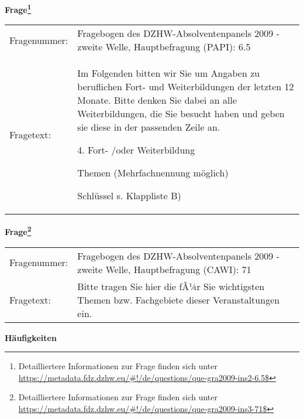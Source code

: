 				\vspace*{0.5cm}
                \noindent\textbf{Frage\footnote{Detailliertere Informationen zur Frage finden sich unter
		              \url{https://metadata.fdz.dzhw.eu/\#!/de/questions/que-gra2009-ins2-6.5$}}}\\
				\begin{tabularx}{\hsize}{@{}lX}
					Fragenummer: &
					  Fragebogen des DZHW-Absolventenpanels 2009 - zweite Welle, Hauptbefragung (PAPI):
					  6.5
 \\
					Fragetext: & Im Folgenden bitten wir Sie um Angaben zu beruflichen Fort- und Weiterbildungen der letzten 12 Monate. Bitte denken Sie dabei an alle Weiterbildungen, die Sie besucht haben und geben sie diese in der passenden Zeile an.\par  4. Fort- /oder Weiterbildung\par  Themen (Mehrfachnennung möglich)\par  Schlüssel s. Klappliste B) \\
				\end{tabularx}
				\vspace*{0.5cm}
                \noindent\textbf{Frage\footnote{Detailliertere Informationen zur Frage finden sich unter
		              \url{https://metadata.fdz.dzhw.eu/\#!/de/questions/que-gra2009-ins3-71$}}}\\
				\begin{tabularx}{\hsize}{@{}lX}
					Fragenummer: &
					  Fragebogen des DZHW-Absolventenpanels 2009 - zweite Welle, Hauptbefragung (CAWI):
					  71
 \\
					Fragetext: & Bitte tragen Sie hier die fÃ¼r Sie wichtigsten Themen bzw. Fachgebiete dieser Veranstaltungen ein. \\
				\end{tabularx}





        		\vspace*{0.5cm}
                \noindent\textbf{Häufigkeiten}

